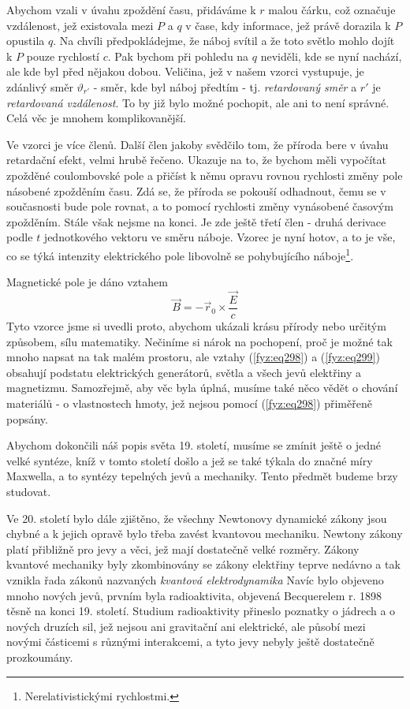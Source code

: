     Abychom vzali v úvahu zpoždění času, přidáváme k \(r\) malou čárku, což označuje vzdálenost, 
    jež existovala mezi \(P\) a \(q\) v čase, kdy informace, jež právě dorazila k \(P\) opustila 
    \(q\). Na chvíli předpokládejme, že náboj svítil a že toto světlo mohlo dojít k \(P\) pouze 
    rychlostí \(c\). Pak bychom při pohledu na \(q\) neviděli, kde se nyní nachází, ale kde byl 
    před nějakou dobou. Veličina, jež v našem vzorci vystupuje, je zdánlivý směr \(\vartheta_{r'}\) 
    - směr, kde byl náboj předtím - tj. \emph{retardovaný směr} a \(r'\) je \emph{retardovaná 
    vzdálenost}. To by již bylo možné pochopit, ale ani to není správné. Celá věc je mnohem 
    komplikovanější. 
    
    Ve vzorci je více členů. Další člen jakoby svědčilo tom, že příroda bere v úvahu retardační 
    efekt, velmi hrubě řečeno. Ukazuje na to, že bychom měli vypočítat zpožděné coulombovské pole a 
    přičíst k němu opravu rovnou rychlosti změny pole násobené zpožděním času. Zdá se, že příroda 
    se pokouší odhadnout, čemu se v současnosti bude pole rovnat, a to pomocí rychlosti změny 
    vynásobené časovým zpožděním. Stále však nejsme na konci. Je zde ještě třetí člen - druhá 
    derivace podle \(t\) jednotkového vektoru ve směru náboje. Vzorec je nyní hotov, a to je vše, 
    co se týká intenzity elektrického pole libovolně se pohybujícího 
    náboje\footnote{Nerelativistickými rychlostmi.}.
    
    Magnetické pole je dáno vztahem
    \begin{equation}\label{fyz:eq299}
      \vec{B} = -\vec{r}_0\times\frac{\vec{E}}{c}
    \end{equation}
    Tyto vzorce jsme si uvedli proto, abychom ukázali krásu přírody nebo určitým způsobem, sílu 
    matematiky. Nečiníme si nárok na pochopení, proč je možné tak mnoho napsat na tak malém 
    prostoru, ale vztahy (\ref{fyz:eq298}) a (\ref{fyz:eq299}) obsahují podstatu elektrických 
    generátorů, světla a všech jevů elektřiny a magnetizmu. Samozřejmě, aby věc byla úplná, musíme 
    také něco vědět o chování materiálů - o vlastnostech hmoty, jež nejsou pomocí (\ref{fyz:eq298}) 
    přiměřeně popsány.
    
    Abychom dokončili náš popis světa 19. století, musíme se zmínit ještě o jedné velké syntéze, 
    kníž v tomto století došlo a jež se také týkala do značné míry Maxwella, a to syntézy tepelných 
    jevů a mechaniky. Tento předmět budeme brzy studovat.
   
    Ve 20. století bylo dále zjištěno, že všechny Newtonovy dynamické zákony jsou chybné a k jejich 
    opravě bylo třeba zavést kvantovou mechaniku. Newtony zákony platí přibližně pro jevy a věci, 
    jež mají dostatečně velké rozměry. Zákony kvantové mechaniky byly zkombinovány se zákony 
    elektřiny teprve nedávno a tak vznikla řada zákonů nazvaných \emph{kvantová elektrodynamika} 
    Navíc bylo objeveno mnoho nových jevů, prvním byla radioaktivita, objevená Becquerelem r. 1898 
    těsně na konci 19. století. Studium radioaktivity přineslo poznatky o jádrech a o nových 
    druzích sil, jež nejsou ani gravitační ani elektrické, ale působí mezi novými částicemi s 
    různými interakcemi, a tyto jevy nebyly ještě dostatečně prozkoumány.
    
